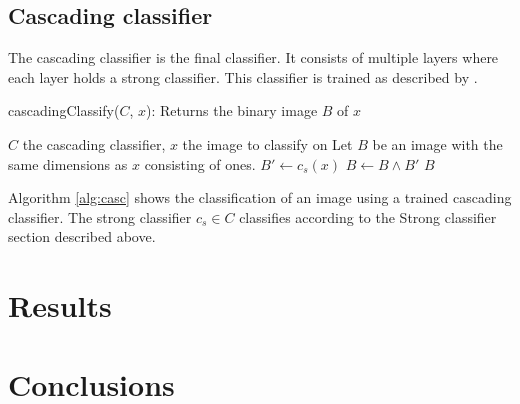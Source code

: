 \documentclass[a4paper,11pt]{article}
\begin{document}
\subsection*{Cascading classifier}
The cascading classifier is the final classifier. It consists of multiple
layers where each layer holds a strong classifier. This classifier is
trained as described by \cite{viola}. 
\begin{algorithm}
	\caption{cascadingClassify($C$, $x$): Returns the binary image $B$ of $x$}
	\begin{algorithmic}[1]
	\REQUIRE $C$ the cascading classifier, $x$ the image to classify on
	\medskip
	\STATE Let $B$ be an image with the same dimensions as $x$ consisting of ones.
		\STATE $B' \leftarrow c_s(x)$
		\STATE $B \leftarrow B \land B'$
	\ENDFOR
	\RETURN $B$
	\end{algorithmic}
\label{alg:casc}
\end{algorithm}
Algorithm \ref{alg:casc} shows the classification of an image using a trained
cascading classifier. The strong classifier $c_s \in C$ classifies according to
the Strong classifier section described above.

\section*{Results}

\section*{Conclusions}

\renewcommand\bibname{References}


\end{document}
